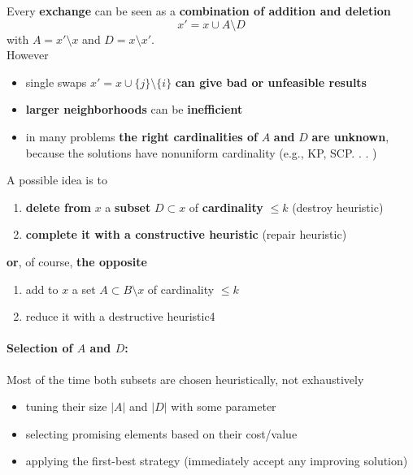 Every \textbf{exchange} can be seen as a \textbf{combination of addition and deletion}
$$ x' = x \cup A \setminus D $$
with $A = x' \setminus x$ and $D = x \setminus x'$.\\

However
\begin{itemize}
	\item single swaps $x' = x \cup \{j\} \setminus \{i\}$ \textbf{can give bad or unfeasible results}
	
	\item \textbf{larger neighborhoods} can be \textbf{inefficient}
	
	\item in many problems \textbf{the right cardinalities of} $A$ \textbf{and} $D$ \textbf{are unknown}, because the solutions have nonuniform cardinality (e.g., KP, SCP. . . )
\end{itemize}

A possible idea is to
\begin{enumerate}
	\item \textbf{delete from} $x$ a \textbf{subset} $D \subset x$ of \textbf{cardinality} $\leq k$ (destroy heuristic)
	\item \textbf{complete it with a constructive heuristic} (repair heuristic)
\end{enumerate}

\textbf{or}, of course, \textbf{the opposite}
\begin{enumerate}
	\item add to $x$ a set $A \subset B \setminus x$ of cardinality $\leq k$
	\item reduce it with a destructive heuristic4
\end{enumerate}

\paragraph{Selection of $A$ and $D$:} Most of the time both subsets are chosen heuristically, not exhaustively
\begin{itemize}
	\item tuning their size $|A|$ and $|D|$ with some parameter
	
	\item selecting promising elements based on their cost/value
	
	\item applying the first-best strategy (immediately accept any improving solution)
\end{itemize}

